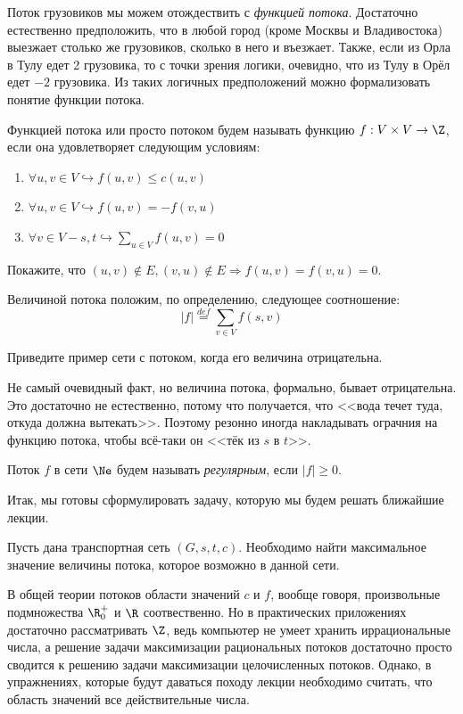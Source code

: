 Поток грузовиков мы можем отождествить с \textit{функцией потока}. Достаточно естественно предположить, что в любой город (кроме Москвы и Владивостока) выезжает столько же грузовиков, сколько в него и въезжает.
Также, если из Орла в Тулу едет 2 грузовика, то с точки зрения логики, очевидно, что из Тулу в Орёл едет $-2$ грузовика. Из таких логичных предположений можно формализовать понятие функции потока.

\Def Функцией потока или просто потоком будем называть функцию $f: V \times V \to \Z$, если она удовлетворяет следующим условиям:
\begin{enumerate}
    \item $\forall u, v \in V \hookrightarrow f(u, v) \leq c(u, v)$
    \item $\forall u, v \in V \hookrightarrow f(u, v) = - f(v, u)$
    \item $\forall v \in V - s, t \hookrightarrow \sum\limits_{u \in V} f(u, v) = 0$
\end{enumerate}

\Exe Покажите, что $(u, v) \not \in E, (v, u) \not \in E \Rightarrow f(u, v) = f(v, u) = 0$.

\Def Величиной потока положим, по определению, следующее соотношение:
\begin{equation*}
    |f| \overset{def}{=} \sum\limits_{v \in V} f(s, v)
\end{equation*}

\Exe Приведите пример сети с потоком, когда его величина отрицательна.

Не самый очевидный факт, но величина потока, формально, бывает отрицательна. Это достаточно не естественно, потому что получается, что <<вода течет туда, откуда должна вытекать>>. Поэтому резонно иногда накладывать ограчния на функцию потока, чтобы всё-таки он <<тёк из $s$ в $t$>>.

\Def Поток $f$ в сети $\Ne$ будем называть \textit{регулярным}, если $|f| \geq 0$.

Итак, мы готовы сформулировать задачу, которую мы будем решать ближайшие лекции.

\Task Пусть дана транспортная сеть $(G, s, t, c)$. Необходимо найти максимальное значение величины потока, которое возможно в данной сети.

\Note В общей теории потоков области значений $c$ и $f$, вообще говоря, произвольные подмножества $\R^+_0$ и $\R$ соотвественно. 
Но в практических приложениях достаточно рассматривать $\Z$, ведь компьютер не умеет хранить иррациональные числа, а решение задачи максимизации рациональных потоков достаточно просто сводится к решению задачи максимизации целочисленных потоков.
Однако, в упражнениях, которые будут даваться походу лекции необходимо считать, что область значений все действительные числа.


